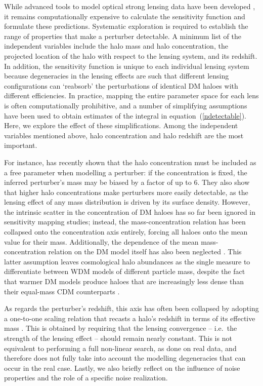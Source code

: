 \documentclass[a4paper, fleqn, usenatbib, useAMS]{mnras}
\begin{document}
While advanced tools to model optical strong lensing data have been
developed \citep[e.g.][]{Vegetti2009, Nightingale2021}, it remains
computationally expensive to calculate the sensitivity function and
formulate these predictions. 
Systematic exploration is required to establish the range of
properties that make a perturber detectable. 
A minimum list of the independent variables include the halo mass and halo concentration,
the projected location of the halo with respect to the lensing system, and its redshift. In addition, 
the sensitivity function is unique to each individual lensing system because degeneracies in the lensing 
effects are such that different lensing configurations can `reabsorb'
the perturbations of identical DM haloes  
with different efficiencies. In practice, mapping the entire parameter space for each lens is  
often computationally prohibitive, and a number of simplifying assumptions have been used to
obtain estimates of the integral in  equation~(\ref{ndetectable}).
Here, we explore the effect of these simplifications.
Among the independent variables mentioned above, halo concentration
and halo redshift are the most important. 

For instance, \citet{Minor2021} has recently shown that the halo
concentration must be included as a free parameter when modelling a
perturber: if the concentration is fixed, the inferred perturber's mass may be 
biased by a factor of up to 6. They also show that higher halo concentrations make perturbers more easily detectable, as the lensing effect of any mass 
distribution is driven by its surface density. However, the intrinsic scatter in the concentration of 
DM haloes \citep[e.g.][]{Neto2007, Ludlow2016, Wang2020} has so far
been ignored in sensitivity mapping studies; instead, the mass-concentration relation 
has been collapsed onto the concentration axis entirely, forcing all haloes onto the mean value for their mass. 
Additionally, the dependence of the mean mass-concentration relation on the DM model itself has also
been neglected \citep[e.g.][]{Vegetti2018,Ritondale2019}. This latter
assumption leaves cosmological halo abundances as the single measure to differentiate 
between WDM models of different particle mass, despite the fact that
warmer DM models produce 
haloes that are increasingly less dense than their equal-mass CDM
counterparts \citep[e.g.][]{Lovell2012, Bose16}.

As regards the perturber's redshift, this axis has often been
collapsed by adopting a one-to-one scaling relation 
that recasts a halo's redshift in terms of its effective mass
\citep{Li2016,Despali2018}. This is obtained by requiring that the lensing convergence
-- i.e.\ the strength of the lensing effect -- should remain nearly
constant. This is not equivalent to performing a full non-linear
search, as done on real data, and therefore does not fully take into
account the modelling degeneracies that can occur  in the real case. Lastly, we also briefly reflect on the influence of 
noise properties and the role of a specific noise realization.
\end{document}
